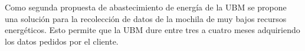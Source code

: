 Como segunda propuesta de abastecimiento de energía de la UBM se propone una solución para la recolección de datos de la mochila de muy bajos recursos energéticos. Esto permite que la UBM dure entre tres a cuatro meses adquiriendo los datos pedidos por el cliente.
